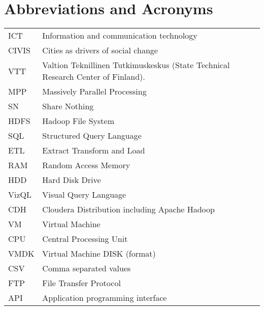 \chapter*{Abbreviations and Acronyms}


\noindent
\begin{longtable}{@{}p{}p{}@{}}
ICT & Information and communication technology \\
CIVIS & Cities as drivers of social change \\ 
VTT & Valtion Teknillinen Tutkimuskeskus (State Technical Research Center of Finland). \\ 
MPP  & Massively Parallel Processing \\
SN & Share Nothing \\ 
HDFS & Hadoop File System\\
SQL & Structured Query Language\\
ETL & Extract Transform and Load\\
RAM & Random Access Memory\\
HDD & Hard Disk Drive\\
VizQL & Visual Query Language\\
CDH & Cloudera Distribution including Apache Hadoop\\
VM & Virtual Machine\\
CPU & Central Processing Unit\\
VMDK & Virtual Machine DISK (format)\\
CSV & Comma separated values\\
FTP & File Transfer Protocol\\
API & Application programming interface\\
\end{longtable}
